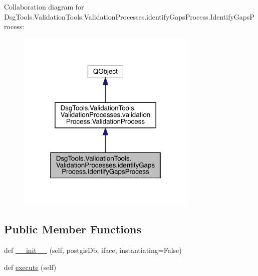 Collaboration diagram for Dsg\+Tools.\+Validation\+Tools.\+Validation\+Processes.\+identify\+Gaps\+Process.\+Identify\+Gaps\+Process\+:
\nopagebreak
\begin{figure}[H]
\begin{center}
\leavevmode
\includegraphics[width=244pt]{class_dsg_tools_1_1_validation_tools_1_1_validation_processes_1_1identify_gaps_process_1_1_identify_gaps_process__coll__graph}
\end{center}
\end{figure}
\subsection*{Public Member Functions}
\begin{DoxyCompactItemize}
\item 
def \mbox{\hyperlink{class_dsg_tools_1_1_validation_tools_1_1_validation_processes_1_1identify_gaps_process_1_1_identify_gaps_process_a442be2b804850f19047dfd97c00318ca}{\+\_\+\+\_\+init\+\_\+\+\_\+}} (self, postgis\+Db, iface, instantiating=False)
\item 
def \mbox{\hyperlink{class_dsg_tools_1_1_validation_tools_1_1_validation_processes_1_1identify_gaps_process_1_1_identify_gaps_process_ace3b684d421f9349a039c62437d3be93}{execute}} (self)
\end{DoxyCompactItemize}
